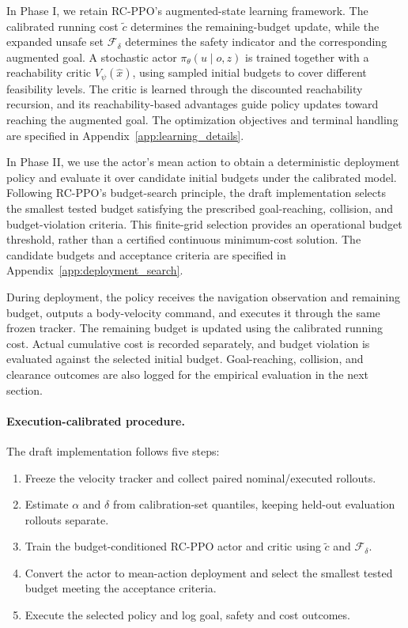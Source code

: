 \documentclass{article}
\begin{document}
In Phase I, we retain RC-PPO's augmented-state learning framework. The calibrated
running cost $\tilde c$ determines the remaining-budget update, while the expanded
unsafe set $\mathcal{F}_\delta$ determines the safety indicator and the corresponding
augmented goal. A stochastic actor $\pi_\theta(u\mid o,z)$ is trained together with
a reachability critic $V_\psi(\hat x)$, using sampled initial budgets to cover
different feasibility levels. The critic is learned through the discounted
reachability recursion, and its reachability-based advantages guide policy updates
toward reaching the augmented goal. The optimization objectives and terminal
handling are specified in Appendix~\ref{app:learning_details}.

In Phase II, we use the actor's mean action to obtain a deterministic deployment
policy and evaluate it over candidate initial budgets under the calibrated model.
Following RC-PPO's budget-search principle, the draft implementation selects the
smallest tested budget satisfying the prescribed goal-reaching, collision, and
budget-violation criteria. This finite-grid selection provides an operational
budget threshold, rather than a certified continuous minimum-cost solution. The
candidate budgets and acceptance criteria are specified in
Appendix~\ref{app:deployment_search}.

During deployment, the policy receives the navigation observation and remaining
budget, outputs a body-velocity command, and executes it through the same frozen
tracker. The remaining budget is updated using the calibrated running cost. Actual
cumulative cost is recorded separately, and budget violation is evaluated against
the selected initial budget. Goal-reaching, collision, and clearance outcomes are
also logged for the empirical evaluation in the next section.

\paragraph{Execution-calibrated procedure.}
The draft implementation follows five steps:
\begin{enumerate}
\item Freeze the velocity tracker and collect paired nominal/executed rollouts.
\item Estimate $\alpha$ and $\delta$ from calibration-set quantiles, keeping
      held-out evaluation rollouts separate.
\item Train the budget-conditioned RC-PPO actor and critic using $\tilde c$ and
      $\mathcal{F}_\delta$.
\item Convert the actor to mean-action deployment and select the smallest tested
      budget meeting the acceptance criteria.
\item Execute the selected policy and log goal, safety and cost outcomes.
\end{enumerate}
\end{document}
